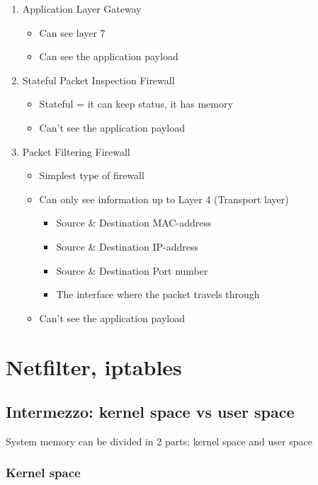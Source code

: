 \documentclass{article}
\begin{document}
\begin{enumerate}
    \item Application Layer Gateway
    \begin{itemize}
        \item Can see layer 7
        \item Can see the application payload
    \end{itemize}
    \item Stateful Packet Inspection Firewall
    \begin{itemize}
        \item Stateful = it can keep status, it has memory
        \item Can't see the application payload
    \end{itemize}
    \item Packet Filtering Firewall
    \begin{itemize}
        \item Simplest type of firewall
        \item Can only see information up to Layer 4 (Transport layer)
        \begin{itemize}
            \item Source \& Destination MAC-address
            \item Source \& Destination IP-address
            \item Source \& Destination Port number
            \item The interface where the packet travels through
        \end{itemize}
        \item Can't see the application payload
    \end{itemize}
\end{enumerate}

\section{Netfilter, iptables}

\subsection{Intermezzo: kernel space vs user space}

System memory can be divided in 2 parts: kernel space and user space

\subsubsection{Kernel space}
\end{document}
